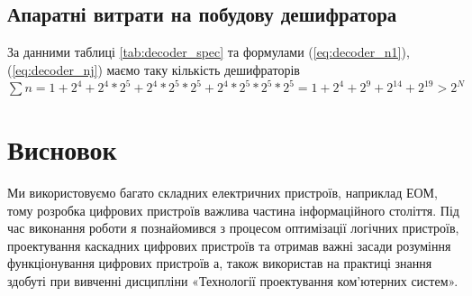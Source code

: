 \section{Апаратні витрати на побудову дешифратора}
За данними таблиці \ref{tab:decoder_spec} та формулами (\ref{eq:decoder_n1}),(\ref{eq:decoder_nj}) маємо таку кількість дешифраторів $\sum n=1+2^{4}+2^{4}*2^{5}+2^{4}*2^{5}*2^{5}+2^{4}*2^{5}*2^{5}*2^{5}=1+2^{4}+2^{9}+2^{14}+2^{19}>2^{N}$
\newpage
\chapter{Висновок}
Ми використовуємо багато складних електричних пристроїв, наприклад ЕОМ, тому розробка цифрових пристроїв важлива частина інформаційного століття. Під час виконання роботи я познайомився з процесом оптимізації логічних пристроїв, проектування каскадних цифрових пристроїв та отримав важні засади розуміння функціонування цифрових пристроїв а, також використав на практиці знання здобуті при вивченні дисципліни «Технології проектування ком'ютерних систем».